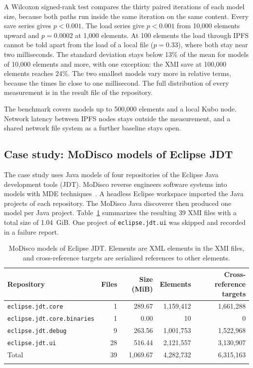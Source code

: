 \documentclass[iicol,pdflatex,sn-mathphys-num]{sn-jnl}
\theoremstyle{thmstylethree}%
\begin{document}
A Wilcoxon signed-rank test compares the thirty paired iterations of each model size, because both paths run inside the same iteration on the same content. Every save series gives $p < 0.001$. The load series give $p < 0.001$ from 10,000 elements upward and $p = 0.0002$ at 1,000 elements. At 100 elements the load through IPFS cannot be told apart from the load of a local file ($p = 0.33$), where both stay near two milliseconds. The standard deviation stays below 13\% of the mean for models of 10,000 elements and more, with one exception: the XMI save at 100,000 elements reaches 24\%. The two smallest models vary more in relative terms, because the times lie close to one millisecond. The full distribution of every measurement is in the result file of the repository.

The benchmark covers models up to 500,000 elements and a local Kubo node. Network latency between IPFS nodes stays outside the measurement, and a shared network file system as a further baseline stays open.

\subsection{Case study: MoDisco models of Eclipse JDT}\label{sec:evaluation-modisco}

The case study uses Java models of four repositories of the Eclipse Java development tools (JDT). MoDisco reverse engineers software systems into models with MDE techniques~\cite{bruneliere2010modisco,bruneliere2014modisco}. A headless Eclipse workspace imported the Java projects of each repository. The MoDisco Java discoverer then produced one model per Java project. Table~\ref{tab:dataset} summarizes the resulting 39 XMI files with a total size of 1.04~GiB. One project of \texttt{eclipse.jdt.ui} was skipped and recorded in a failure report.

\begin{table}[t]
\caption{MoDisco models of Eclipse JDT. Elements are XML elements in the XMI files, and cross-reference targets are serialized references to other elements.}\label{tab:dataset}
\begin{tabular*}{\textwidth}{@{\extracolsep\fill}lrrrr@{}}
\toprule
Repository & Files & Size (MiB) & Elements & Cross-reference targets \\
\midrule
\texttt{eclipse.jdt.core} & 1 & 289.67 & 1,159,412 & 1,661,288 \\
\texttt{eclipse.jdt.core.binaries} & 1 & 0.00 & 10 & 0 \\
\texttt{eclipse.jdt.debug} & 9 & 263.56 & 1,001,753 & 1,522,968 \\
\texttt{eclipse.jdt.ui} & 28 & 516.44 & 2,121,557 & 3,130,907 \\
\midrule
Total & 39 & 1,069.67 & 4,282,732 & 6,315,163 \\
\botrule
\end{tabular*}
\end{table}
\end{document}

